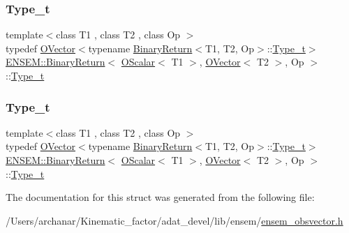 \subsubsection{\texorpdfstring{Type\_t}{Type\_t}\hspace{0.1cm}{\footnotesize\ttfamily [1/2]}}
{\footnotesize\ttfamily template$<$class T1 , class T2 , class Op $>$ \\
typedef \mbox{\hyperlink{classENSEM_1_1OVector}{O\+Vector}}$<$typename \mbox{\hyperlink{structENSEM_1_1BinaryReturn}{Binary\+Return}}$<$T1, T2, Op$>$\+::\mbox{\hyperlink{structENSEM_1_1BinaryReturn_3_01OScalar_3_01T1_01_4_00_01OVector_3_01T2_01_4_00_01Op_01_4_ab27873926cc30b187ec230fa31f23dae}{Type\+\_\+t}}$>$ \mbox{\hyperlink{structENSEM_1_1BinaryReturn}{E\+N\+S\+E\+M\+::\+Binary\+Return}}$<$ \mbox{\hyperlink{classENSEM_1_1OScalar}{O\+Scalar}}$<$ T1 $>$, \mbox{\hyperlink{classENSEM_1_1OVector}{O\+Vector}}$<$ T2 $>$, Op $>$\+::\mbox{\hyperlink{structENSEM_1_1BinaryReturn_3_01OScalar_3_01T1_01_4_00_01OVector_3_01T2_01_4_00_01Op_01_4_ab27873926cc30b187ec230fa31f23dae}{Type\+\_\+t}}}

\mbox{\label{structENSEM_1_1BinaryReturn_3_01OScalar_3_01T1_01_4_00_01OVector_3_01T2_01_4_00_01Op_01_4_ab27873926cc30b187ec230fa31f23dae}} 
\subsubsection{\texorpdfstring{Type\_t}{Type\_t}\hspace{0.1cm}{\footnotesize\ttfamily [2/2]}}
{\footnotesize\ttfamily template$<$class T1 , class T2 , class Op $>$ \\
typedef \mbox{\hyperlink{classENSEM_1_1OVector}{O\+Vector}}$<$typename \mbox{\hyperlink{structENSEM_1_1BinaryReturn}{Binary\+Return}}$<$T1, T2, Op$>$\+::\mbox{\hyperlink{structENSEM_1_1BinaryReturn_3_01OScalar_3_01T1_01_4_00_01OVector_3_01T2_01_4_00_01Op_01_4_ab27873926cc30b187ec230fa31f23dae}{Type\+\_\+t}}$>$ \mbox{\hyperlink{structENSEM_1_1BinaryReturn}{E\+N\+S\+E\+M\+::\+Binary\+Return}}$<$ \mbox{\hyperlink{classENSEM_1_1OScalar}{O\+Scalar}}$<$ T1 $>$, \mbox{\hyperlink{classENSEM_1_1OVector}{O\+Vector}}$<$ T2 $>$, Op $>$\+::\mbox{\hyperlink{structENSEM_1_1BinaryReturn_3_01OScalar_3_01T1_01_4_00_01OVector_3_01T2_01_4_00_01Op_01_4_ab27873926cc30b187ec230fa31f23dae}{Type\+\_\+t}}}



The documentation for this struct was generated from the following file\+:\begin{DoxyCompactItemize}
\item 
/\+Users/archanar/\+Kinematic\+\_\+factor/adat\+\_\+devel/lib/ensem/\mbox{\hyperlink{lib_2ensem_2ensem__obsvector_8h}{ensem\+\_\+obsvector.\+h}}\end{DoxyCompactItemize}
